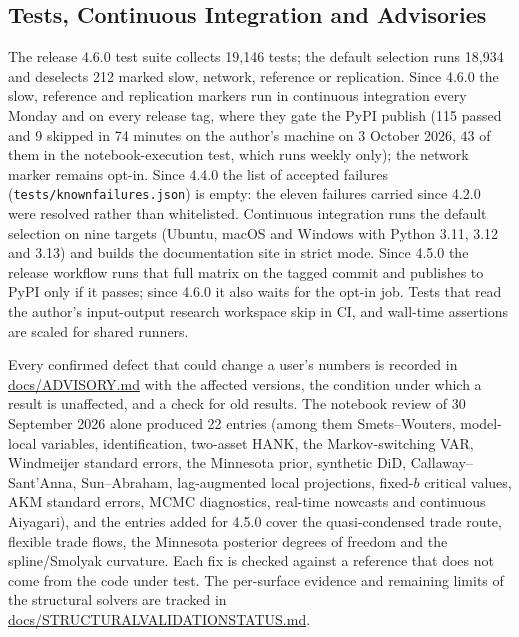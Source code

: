 \documentclass[11pt,letterpaper]{article}
\renewcommand{\_}{\pmunderscore\allowbreak}
\begin{document}
\subsection{Tests, Continuous Integration and Advisories}\label{tests-continuous-integration-and-advisories}

The release 4.6.0 test suite collects 19,146 tests; the default selection runs 18,934 and deselects 212 marked slow, network, reference or replication. Since 4.6.0 the slow, reference and replication markers run in continuous integration every Monday and on every release tag, where they gate the PyPI publish (115 passed and 9 skipped in 74 minutes on the author's machine on 3 October 2026, 43 of them in the notebook-execution test, which runs weekly only); the network marker remains opt-in. Since 4.4.0 the list of accepted failures (\texttt{tests/known\_failures.json}) is empty: the eleven failures carried since 4.2.0 were resolved rather than whitelisted. Continuous integration runs the default selection on nine targets (Ubuntu, macOS and Windows with Python 3.11, 3.12 and 3.13) and builds the documentation site in strict mode. Since 4.5.0 the release workflow runs that full matrix on the tagged commit and publishes to PyPI only if it passes; since 4.6.0 it also waits for the opt-in job. Tests that read the author's input-output research workspace skip in CI, and wall-time assertions are scaled for shared runners.

Every confirmed defect that could change a user's numbers is recorded in \href{https://github.com/jalonso1979/puremacro/blob/v4.6.0/docs/ADVISORY.md}{docs/ADVISORY.md} with the affected versions, the condition under which a result is unaffected, and a check for old results. The notebook review of 30 September 2026 alone produced 22 entries (among them Smets--Wouters, model-local variables, identification, two-asset HANK, the Markov-switching VAR, Windmeijer standard errors, the Minnesota prior, synthetic DiD, Callaway--Sant'Anna, Sun--Abraham, lag-augmented local projections, fixed-\(b\) critical values, AKM standard errors, MCMC diagnostics, real-time nowcasts and continuous Aiyagari), and the entries added for 4.5.0 cover the quasi-condensed trade route, flexible trade flows, the Minnesota posterior degrees of freedom and the spline/Smolyak curvature. Each fix is checked against a reference that does not come from the code under test. The per-surface evidence and remaining limits of the structural solvers are tracked in \href{https://github.com/jalonso1979/puremacro/blob/v4.6.0/docs/STRUCTURAL_VALIDATION_STATUS.md}{docs/STRUCTURAL\_VALIDATION\_STATUS.md}.
\end{document}
